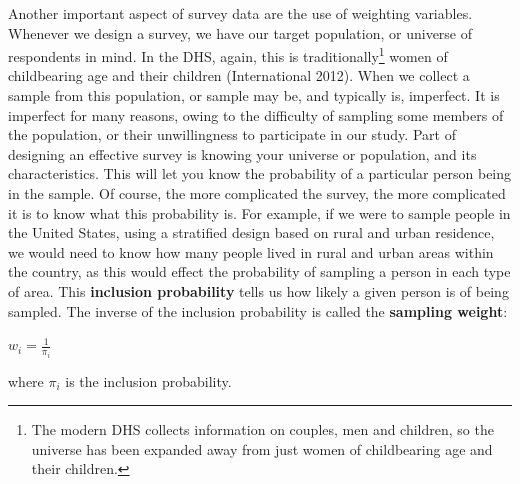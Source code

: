 \documentclass[
  letterpaper,
  DIV=11,
  numbers=noendperiod]{scrreprt}
\begin{document}
Another important aspect of survey data are the use of weighting
variables. Whenever we design a survey, we have our target population,
or universe of respondents in mind. In the DHS, again, this is
traditionally\footnote{The modern DHS collects information on couples,
  men and children, so the universe has been expanded away from just
  women of childbearing age and their children.} women of childbearing
age and their children (International 2012). When we collect a sample
from this population, or sample may be, and typically is, imperfect. It
is imperfect for many reasons, owing to the difficulty of sampling some
members of the population, or their unwillingness to participate in our
study. Part of designing an effective survey is knowing your universe or
population, and its characteristics. This will let you know the
probability of a particular person being in the sample. Of course, the
more complicated the survey, the more complicated it is to know what
this probability is. For example, if we were to sample people in the
United States, using a stratified design based on rural and urban
residence, we would need to know how many people lived in rural and
urban areas within the country, as this would effect the probability of
sampling a person in each type of area. This \textbf{inclusion
probability} tells us how likely a given person is of being sampled. The
inverse of the inclusion probability is called the \textbf{sampling
weight}:

\(w_i = \frac{1} {\pi_i}\)

where \(\pi_i\) is the inclusion probability.
\end{document}
